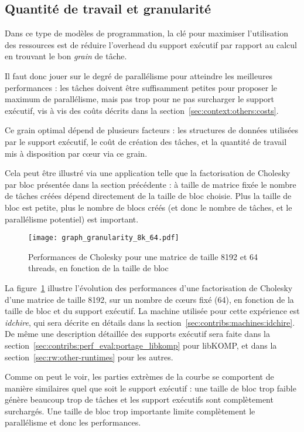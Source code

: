 \subsection{Quantité de travail et granularité}\label{sec:context:others:granularity}


Dans ce type de modèles de programmation, la clé pour maximiser l'utilisation des ressources est de réduire l'overhead du support exécutif par rapport au calcul en trouvant le bon \emph{grain} de tâche.

Il faut donc jouer sur le degré de parallélisme pour atteindre les meilleures performances : les tâches doivent être suffisamment petites pour proposer le maximum de parallélisme, mais pas trop pour ne pas surcharger le support exécutif, vis à vis des coûts décrits dans la section~\ref{sec:context:others:costs}.

Ce grain optimal dépend de plusieurs facteurs : les structures de données utilisées par le support exécutif, le coût de création des tâches, et la quantité de travail mis à disposition par cœur via ce grain.

Cela peut être illustré via une application telle que la factorisation de Cholesky par bloc présentée dans la section précédente : à taille de matrice fixée le nombre de tâches créées dépend directement de la taille de bloc choisie.
Plus la taille de bloc est petite, plus le nombre de blocs créés (et donc le nombre de tâches, et le parallélisme potentiel) est important.

\begin{figure}[ht]
  \centering
  \texttt{[image: graph\_granularity\_8k\_64.pdf]}
  \caption{Performances de Cholesky pour une matrice de taille 8192 et 64 threads, en fonction de la taille de bloc}\label{fig:context:granularity}
\end{figure}

La figure~\ref{fig:context:granularity} illustre l'évolution des performances d'une factorisation de Cholesky d'une matrice de taille 8192, sur un nombre de cœurs fixé (64), en fonction de la taille de bloc et du support exécutif.
La machine utilisée pour cette expérience est \emph{idchire}, qui sera décrite en détails dans la section~\ref{sec:contribs:machines:idchire}.
De même une description détaillée des supports exécutif sera faite dans la section~\ref{sec:contribs:perf_eval:portage_libkomp} pour libKOMP, et dans la section~\ref{sec:rw:other-runtimes} pour les autres.

Comme on peut le voir, les parties extrèmes de la courbe se comportent de manière similaires quel que soit le support exécutif : une taille de bloc trop faible génère beaucoup trop de tâches et les support exécutifs sont complètement surchargés. Une taille de bloc trop importante limite complètement le parallélisme et donc les performances.

